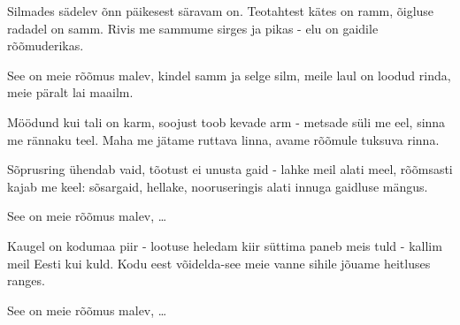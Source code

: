 Silmades s\"adelev \~onn
p\"aikesest s\"aravam on.
Teotahtest k\"ates on ramm,
\~oigluse radadel on samm.
Rivis me sammume sirges ja pikas -
elu on gaidile r\~o\~omuderikas.

See on meie r\~o\~omus malev,
kindel samm ja selge silm,
meile laul on loodud rinda,
meie p\"aralt lai maailm.

M\"o\"odund kui tali on karm,
soojust toob kevade arm -
metsade s\"uli me eel,
sinna me r\"annaku teel.
Maha me j\"atame ruttava linna,
avame r\~o\~omule tuksuva rinna.

S\~oprusring \"uhendab vaid,
t\~ootust ei unusta gaid -
lahke meil alati meel,
r\~o\~omsasti kajab me keel:
s\~osargaid, hellake, nooruseringis
alati innuga gaidluse m\"angus.

See on meie r\~o\~omus malev, \ldots

Kaugel on kodumaa piir -
lootuse heledam kiir
s\"uttima paneb meis tuld -
kallim meil Eesti kui kuld.
Kodu eest v\~oidelda-see meie vanne
sihile j\~ouame heitluses ranges.

See on meie r\~o\~omus malev, \ldots